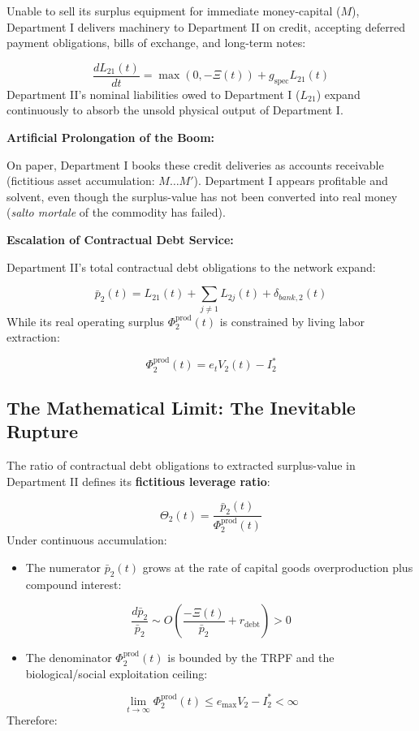 \documentclass[11pt,letterpaper]{report}
\begin{document}
Unable to sell its surplus equipment for immediate money-capital ($M$), Department I delivers machinery to Department II on credit, accepting deferred payment obligations, bills of exchange, and long-term notes:

\[
\frac{d{L}_{21}(t)}{dt}=\max\left({0,-\Xi (t)}\right)+{g}_{\mathrm{spec}}{L}_{21}(t)
\]
Department II's nominal liabilities owed to Department I (${L}_{21}$) expand continuously to absorb the unsold physical output of Department I.

\textbf{Artificial Prolongation of the Boom:}

On paper, Department I books these credit deliveries as accounts receivable (fictitious asset accumulation: $M \dots M'$). Department I appears profitable and solvent, even though the surplus-value has not been converted into real money (\emph{salto mortale} of the commodity has failed).

\textbf{Escalation of Contractual Debt Service:}

Department II's total contractual debt obligations to the network expand:

\[
{\bar{p}}_{2}(t)={L}_{21}(t)+\sum_{j\ne 1}{L}_{2j}(t)+{\delta }_{bank,2}(t)
\]
While its real operating surplus ${\Phi }_{2}^{\mathrm{prod}}(t)$ is constrained by living labor extraction:

\[
{\Phi }_{2}^{\mathrm{prod}}(t)={e}_{t}{V}_{2}(t)-{I}_{2}^{*}
\]
\subsection{The Mathematical Limit: The Inevitable Rupture}
The ratio of contractual debt obligations to extracted surplus-value in Department II defines its \textbf{fictitious leverage ratio}:

\[
{\Theta }_{2}(t)=\frac{{\bar{p}}_{2}(t)}{{\Phi }_{2}^{\mathrm{prod}}(t)}
\]
Under continuous accumulation:

\begin{itemize}
\item The numerator ${\bar{p}}_{2}(t)$ grows at the rate of capital goods overproduction plus compound interest:
\end{itemize}
\[
\frac{d{\bar{p}}_{2}}{{\bar{p}}_{2}}\sim O\left({\frac{-\Xi (t)}{{\bar{p}}_{2}}+{r}_{\mathrm{debt}}}\right)>0
\]
\begin{itemize}
\item The denominator ${\Phi }_{2}^{\mathrm{prod}}(t)$ is bounded by the TRPF and the biological/social exploitation ceiling:
\end{itemize}
\[
\lim\limits_{{t} \rightarrow {\infty }}{\Phi }_{2}^{\mathrm{prod}}(t)\leq {e}_{\max}{V}_{2}-{I}_{2}^{*}<\infty
\]
Therefore:
\end{document}
